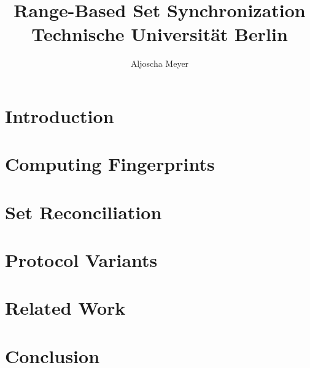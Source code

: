 \documentclass[12pt,twoside]{report}
\title{
{Range-Based Set Synchronization}\\
{\large Technische Universität Berlin}
}
\author{Aljoscha Meyer}
\begin{document}
\maketitle





\tableofcontents

\chapter{Introduction}
\label{introduction}


\chapter{Computing Fingerprints}
\label{fingerprints}


\chapter{Set Reconciliation}
\label{basic-set-reconciliation}


\chapter{Protocol Variants}
\label{other-data-structures}


\chapter{Related Work}
\label{related-work}


\chapter{Conclusion}
\label{conclusion}




\end{document}
